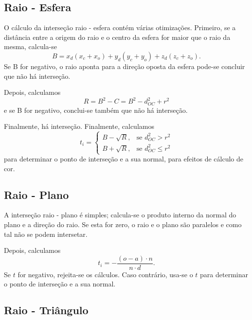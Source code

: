\documentclass{article}
\begin{document}
    \subsection*{Raio - Esfera}

        \par
        O cálculo da interseção raio - esfera contém várias otimizações. Primeiro, se a distância entre a origem do raio e o centro da esfera for maior que o raio da mesma, calcula-se 
        $$ B = x_d (x_c + x_o) + y_d (y_c + y_o) + z_d (z_c + z_o). $$
        Se B for negativo, o raio aponta para a direção oposta da esfera pode-se concluir que não há interseção.
        \par
        Depois, calculamos $$ R = B^2 - C = B^2 - d^2_{OC} + r^2 $$ e se B for negativo, conclui-se também que não há interseção.
        \par
        Finalmente, há interseção. Finalmente, calculamos
        $$
            t_i =
            \begin{cases}
                B - \sqrt{R}, &\mbox{se } d^2_{OC} > r^2\\
                B + \sqrt{R}, &\mbox{se } d^2_{OC} \leq r^2 
            \end{cases}
        $$
        para determinar o ponto de interseção e a sua normal, para efeitos de cálculo de cor.
        

    \subsection*{Raio - Plano}
        \par
        A interseção raio - plano é simples; calcula-se o produto interno da normal do plano e a direção do raio. Se esta for zero, o raio e o plano são paralelos e como tal não se podem intersetar.
        \par
        Depois, calculamos
        $$
            t_i = -\frac{(o - a) \cdot n }{ n \cdot d}.
        $$
        Se $t$ for negativo, rejeita-se os cálculos. Caso contrário, usa-se o $t$ para determinar o ponto de interseção e a sua normal.
    \subsection*{Raio - Triângulo}
\end{document}

